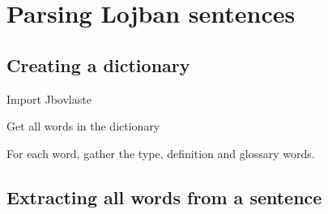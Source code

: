 \chapter{Parsing Lojban sentences}

\section{Creating a dictionary}

Import Jbovlaste

Get all words in the dictionary

For each word, gather the type, definition and glossary words.

\section{Extracting all words from a sentence}

